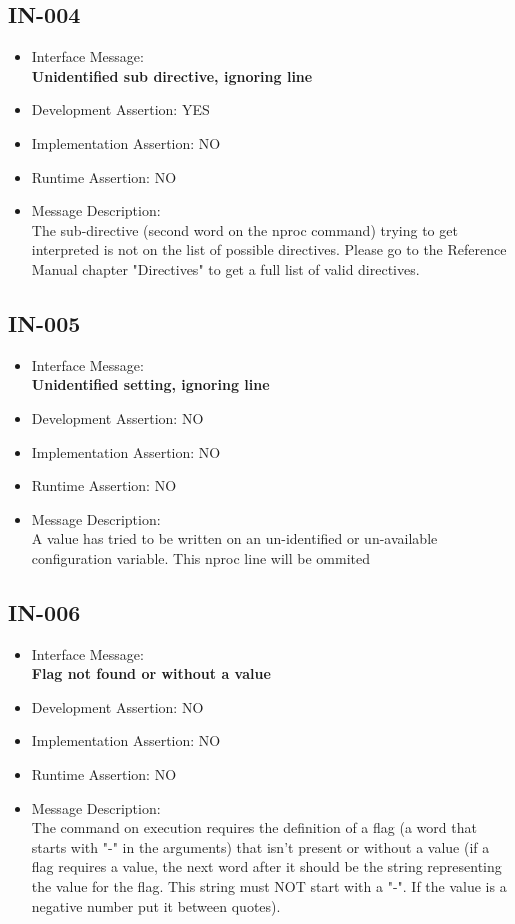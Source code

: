 \subsection{IN-004}
\begin{itemize}
  \item Interface Message:\\[1em]\textbf{Unidentified sub directive, ignoring line}
  \item Development Assertion: YES
  \item Implementation Assertion: NO
  \item Runtime Assertion: NO
  \item Message Description:\\[1em]The sub-directive (second word on the nproc command)  trying to get interpreted is not on the list of possible directives. Please go to the Reference Manual chapter "Directives" to get a full list of valid directives.
\end{itemize}

\subsection{IN-005}
\begin{itemize}
  \item Interface Message:\\[1em]\textbf{Unidentified setting, ignoring line}
  \item Development Assertion: NO
  \item Implementation Assertion: NO
  \item Runtime Assertion: NO
  \item Message Description:\\[1em]A value has tried to be written on an un-identified or un-available configuration variable. This nproc line will be ommited
\end{itemize}

\subsection{IN-006}
\begin{itemize}
  \item Interface Message:\\[1em]\textbf{Flag not found or without a value}
  \item Development Assertion: NO
  \item Implementation Assertion: NO
  \item Runtime Assertion: NO
  \item Message Description:\\[1em]The command on execution requires the definition of a flag (a word that starts with "-" in the arguments) that isn't present or without a value (if a flag requires a value, the next word after it should be the string representing the value for the flag. This string must NOT start with a "-". If the value is a negative number put it between quotes).
\end{itemize}

